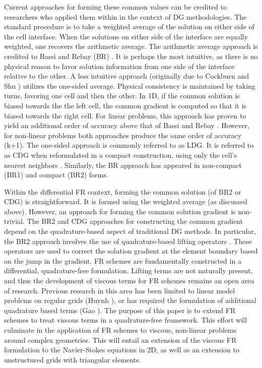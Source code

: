 \vspace{0.1 in}

\noindent Current approaches for forming these common values can be credited to researchers who applied them within in the context of DG methodologies. The standard procedure is to take a weighted average of the solution on either side of the cell interface. When the solutions on either side of the interface are equally weighted, one recovers the arithmetic average. The arithmetic average approach is credited to Bassi and Rebay (BR) \cite{Bassi97}. It is perhaps the most intuitive, as there is no physical reason to favor solution information from one side of the interface relative to the other. A less intuitive approach (originally due to Cockburn and Shu \cite{Cockburn98}) utilizes the one-sided average. Physical consistency is maintained by taking turns, favoring one cell and then the other. In 1D, if the common solution is biased towards the the left cell, the common gradient is computed so that it is biased towards the right cell. For linear problems, this approach has proven to yield an additional order of accuracy above that of Bassi and Rebay \cite{Huynh09}. However, for non-linear problems both approaches produce the same order of accuracy (k+1).  The one-sided approach is commonly referred to as LDG. It is referred to as CDG when reformulated in a compact construction, using only the cell's nearest neighbors \cite{Peraire08}. Similarly, the BR approach has appeared in non-compact (BR1)\cite{Bassi97} and compact (BR2) \cite{Bassi00} forms. 

\vspace{0.1 in}

\noindent Within the differential FR context, forming the common solution (of BR2 or CDG) is straightforward. It is formed using the weighted average (as discussed above). However, an approach for forming the common solution gradient is non-trivial. The BR2 and CDG approaches for constructing the common gradient depend on the quadrature-based aspect of traditional DG methods. In particular, the BR2 approach involves the use of quadrature-based lifting operators \cite{Bassi97}. These operators are used to correct the solution gradient at the element boundary based on the jump in the gradient. FR schemes are fundamentally constructed in a differential, quadrature-free formulation. Lifting terms are not naturally present, and thus the development of viscous terms for FR schemes remains an open area of research. Previous research in this area has been limited to linear model problems on regular grids (Huynh \cite{Huynh09}), or has required the formulation of additional quadrature based terms (Gao \cite{Gao09}). The purpose of this paper is to extend FR schemes to treat viscous terms in a quadrature-free framework. This effort will culminate in the application of FR schemes to viscous, non-linear problems around complex geometries. This will entail an extension of the viscous FR formulation to the Navier-Stokes equations in 2D, as well as an extension to unstructured grids with triangular elements.

